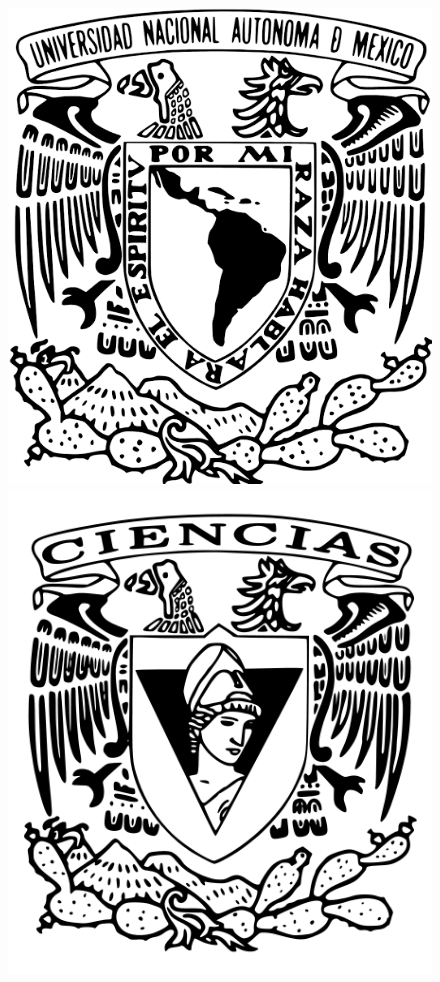 \documentclass[a4paper]{article}
\begin{document}
\begin{titlepage}
\paragraph{}

\begin{center}
\vspace*{0.10in}
\begin{figure}
\raggedleft
\includegraphics[scale=0.12]{unam.png}
\hspace{7.2cm}
\raggedright
\includegraphics[scale=0.15]{fac.png}    

\end{figure}
\end{center}
\end{titlepage}
\end{document}
